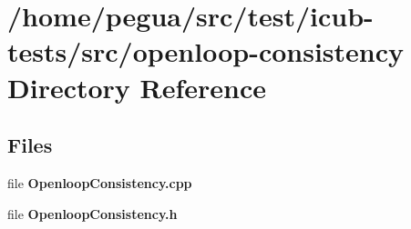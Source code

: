 \section{/home/pegua/src/test/icub-\/tests/src/openloop-\/consistency Directory Reference}
\label{dir_f9de59b413a1f1ae04ea264c82cc2719}
\subsection*{Files}
\begin{DoxyCompactItemize}
\item 
file {\bfseries Openloop\-Consistency.\-cpp}
\item 
file {\bfseries Openloop\-Consistency.\-h}
\end{DoxyCompactItemize}
